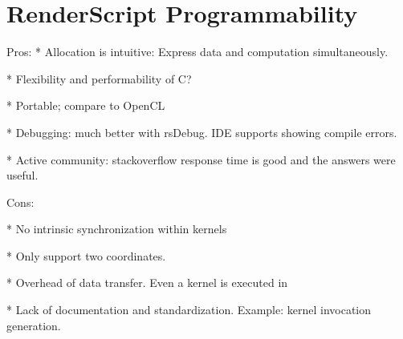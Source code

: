 \section{RenderScript Programmability}
Pros:
* Allocation is intuitive: Express data and computation simultaneously.

* Flexibility and performability of C?

* Portable; compare to OpenCL

* Debugging: much better with rsDebug. IDE supports showing compile errors.

* Active community: stackoverflow response time is good and the answers were useful.

Cons:

* No intrinsic synchronization within kernels

* Only support two coordinates.

* Overhead of data transfer. Even a kernel is executed in 

* Lack of documentation and standardization. Example: kernel invocation generation.


